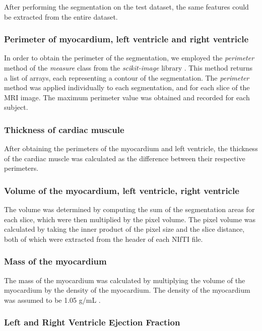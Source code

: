 \documentclass[conference]{IEEEtran}
\begin{document}
    After performing the segmentation on the test dataset, the same features could be extracted from the entire dataset.

    \subsubsection{Perimeter of myocardium, left ventricle and right ventricle}
        In order to obtain the perimeter of the segmentation, we employed the \textit{perimeter} method of the 
        \textit{measure} class from the \textit{scikit-image} library \cite{scikit-image}. This method returns a list of
        arrays, each representing a contour of the segmentation. The \textit{perimeter} method was applied individually 
        to each segmentation, and for each slice of the MRI image. The maximum perimeter value was obtained and recorded 
        for each subject.

    \subsubsection{Thickness of cardiac muscule}
        After obtaining the perimeters of the myocardium and left ventricle, the thickness of the cardiac muscle was
         calculated as the difference between their respective perimeters.

    \subsubsection{Volume of the myocardium, left ventricle, right ventricle}

        The volume was determined by computing the sum of the segmentation areas for each slice, which were then 
        multiplied by the pixel volume. The pixel volume was calculated by taking the inner product of the pixel size and
        the slice distance, both of which were extracted from the header of each NIfTI file.

    \subsubsection{Mass of the myocardium}

        The mass of the myocardium was calculated by multiplying the volume of the myocardium by the density of the
        myocardium. The density of the myocardium was assumed to be 1.05 g/mL \cite{Vinnakota2003}.

    \subsubsection{Left and Right Ventricle Ejection Fraction}
\end{document}
